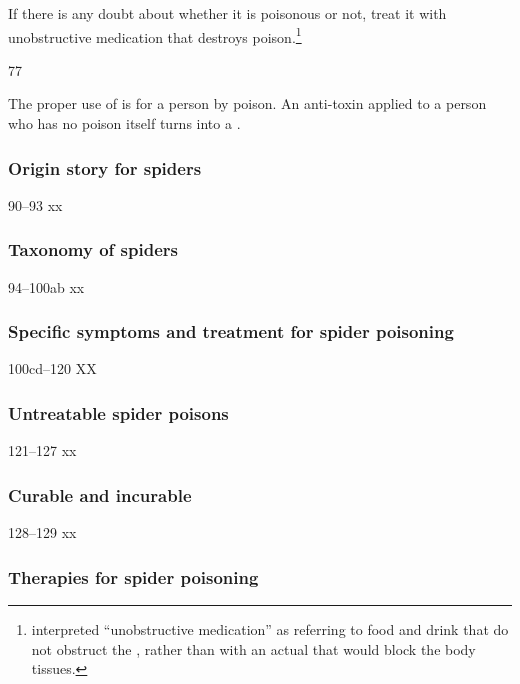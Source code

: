 \begin{translation}
If there is any doubt about whether it is poisonous or not, treat it
with unobstructive medication that destroys
poison.\footnote{ interpreted “unobstructive
    medication” as referring to food and drink that do not obstruct the
    , rather than with an actual
     that would block the body tissues.}

\item[77]

The proper use of  is for a person  
by poison. An anti-toxin applied to a person who has no poison itself turns into a 
.

 
 \subsubsection{Origin story for spiders}
 
 \item[90--93] xx
 
 \subsubsection{Taxonomy of spiders}
 
 \item[94--100ab] xx
 
 \subsubsection{Specific symptoms and treatment for spider 
 poisoning}
 
 \item[100cd--120] XX
 
 \subsubsection{Untreatable spider poisons}
 
 \item [121--127] xx
 
 \subsubsection{Curable and incurable}
 
 \item[128--129] xx
 
 \subsubsection{Therapies for spider poisoning}
 

\end{translation}
